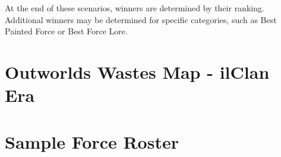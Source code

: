 \documentclass{article}
\begin{document}
At the end of these scenarios, winners are determined by their ranking.
Additional winners may be determined for specific categories, such as Best Painted Force or Best Force Lore.

\newpage

\section{Outworlds Wastes Map - ilClan Era}

\begin{figure}[!h]
  \centering
\end{figure}

\newpage

\section{Sample Force Roster}
\end{document}
